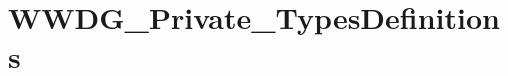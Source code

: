 \hypertarget{group___w_w_d_g___private___types_definitions}{}\section{W\+W\+D\+G\+\_\+\+Private\+\_\+\+Types\+Definitions}
\label{group___w_w_d_g___private___types_definitions}
